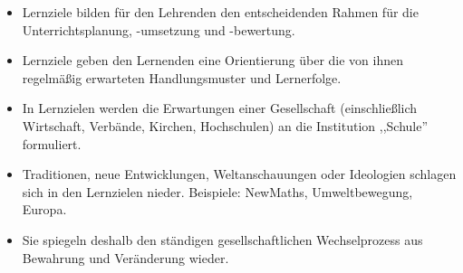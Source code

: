 \begin{itemize}
	\item Lernziele bilden f\"{u}r den Lehrenden den entscheidenden Rahmen f\"{u}r die
	Unterrichtsplanung, -umsetzung und -bewertung.
	\item Lernziele geben den Lernenden eine Orientierung über die von ihnen regelmäßig erwarteten Handlungsmuster und Lernerfolge.
	\item In Lernzielen werden die Erwartungen einer Gesellschaft
	(einschlie{\ss}lich Wirtschaft, Verb\"{a}nde, Kirchen, Hochschulen) an
	die Institution ,,Schule'' formuliert.
	\item Traditionen, neue Entwicklungen, Weltanschauungen oder
	Ideologien schlagen sich in den Lernzielen nieder.
	Beispiele: NewMaths, Umweltbewegung, Europa.
	\item
	Sie spiegeln deshalb den st\"{a}ndigen gesellschaftlichen
	Wechselprozess aus Bewahrung und Ver\"{a}nderung wieder.
%	
\end{itemize}

